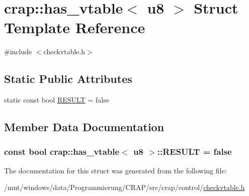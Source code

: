 \hypertarget{structcrap_1_1has__vtable_3_01u8_01_4}{\section{crap\-:\-:has\-\_\-vtable$<$ u8 $>$ Struct Template Reference}
\label{structcrap_1_1has__vtable_3_01u8_01_4}
}


{\ttfamily \#include $<$checkvtable.\-h$>$}

\subsection*{Static Public Attributes}
\begin{DoxyCompactItemize}
\item 
static const bool \hyperlink{structcrap_1_1has__vtable_3_01u8_01_4_a5caab64ac9c3206b14ae1912940c996f}{R\-E\-S\-U\-L\-T} = false
\end{DoxyCompactItemize}


\subsection{Member Data Documentation}
\hypertarget{structcrap_1_1has__vtable_3_01u8_01_4_a5caab64ac9c3206b14ae1912940c996f}{
\subsubsection[{R\-E\-S\-U\-L\-T}]{\setlength{\rightskip}{0pt plus 5cm}const bool {\bf crap\-::has\-\_\-vtable}$<$ {\bf u8} $>$\-::R\-E\-S\-U\-L\-T = false\hspace{0.3cm}{\ttfamily [static]}}}\label{structcrap_1_1has__vtable_3_01u8_01_4_a5caab64ac9c3206b14ae1912940c996f}


The documentation for this struct was generated from the following file\-:\begin{DoxyCompactItemize}
\item 
/mnt/windows/data/\-Programmierung/\-C\-R\-A\-P/src/crap/control/\hyperlink{checkvtable_8h}{checkvtable.\-h}\end{DoxyCompactItemize}
